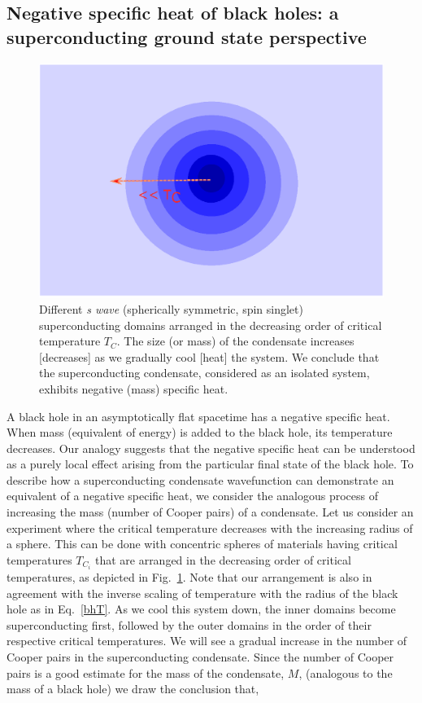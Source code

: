 \documentclass[12pt,letterpaper,aps,onecolumn,superscriptaddress,floatfix,notitlepage]{revtex4-1}
\begin{document}
	\subsection{Negative specific heat of black holes: a superconducting ground state perspective}
	\begin{figure}
		\includegraphics[scale=0.5]{fig7.eps}  		\caption{Different \textit{s wave} (spherically symmetric, spin singlet) superconducting domains arranged in the decreasing order of critical temperature $T_{C}$. The size (or mass) of the condensate increases [decreases] as we gradually cool [heat] the system. We conclude that the superconducting condensate, considered as an isolated system, exhibits negative (mass) specific heat.\label{scT}} 
	\end{figure}
	A black hole in an asymptotically flat spacetime has a negative specific heat. When mass (equivalent of energy) is added to the black hole, its temperature decreases. Our analogy suggests that the negative specific heat can be understood as a purely local effect arising from the particular final state of the black hole. To describe how a superconducting condensate wavefunction can demonstrate an equivalent of a negative specific heat, we consider the analogous process of increasing the mass (number of Cooper pairs) of a condensate.  Let us consider an experiment where the critical temperature decreases with the increasing radius of a sphere. This can be done with concentric spheres of materials having critical temperatures $T_{C_{i}}$ that are arranged in the decreasing order of critical temperatures,  as depicted in Fig.~\ref{scT}. Note that our arrangement is also in agreement with the inverse scaling of temperature with the radius of the black hole as in Eq.~\eqref{bhT}. As we cool this system down, the inner domains become superconducting first, followed by the outer domains in the order of their respective critical temperatures. We will see a gradual increase in the number of Cooper pairs in the superconducting condensate.  Since the number of Cooper pairs is a good estimate for the mass of the condensate, $M$, (analogous to the mass of a black hole) we draw the conclusion that,
\end{document}
